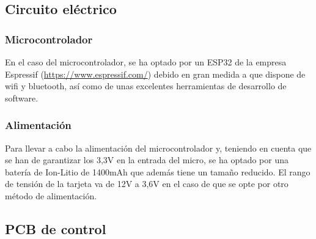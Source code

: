 \documentclass[paper=a4, fontsize=11pt,twoside]{scrartcl}	%
\begin{document}
    \subsection{Circuito eléctrico}
        \subsubsection{Microcontrolador} 
            En el caso del microcontrolador, se ha optado por un ESP32 de la empresa Espressif (\url{https://www.espressif.com/})
            debido en gran medida a que dispone de wifi y bluetooth, así como de unas excelentes herramientas
            de desarrollo de software. 
        \subsubsection{Alimentación} 
            Para llevar a cabo la alimentación del microcontrolador y, teniendo en cuenta que se han de garantizar los 3,3V en la entrada
            del micro, se ha optado por una batería de Ion-Litio de 1400mAh que además tiene un tamaño reducido. El rango de tensión de la
            tarjeta va de 12V a 3,6V en el caso de que se opte por otro método de alimentación.
    \subsection{PCB de control}
\end{document}
